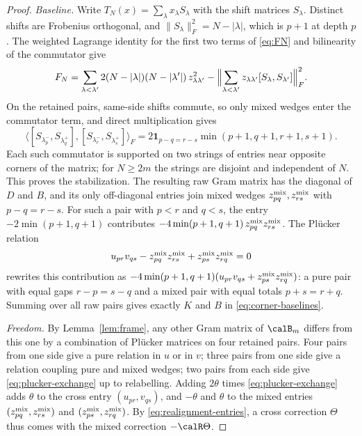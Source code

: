 \begin{proof} \emph{Baseline.} Write $T_N(x)=\sum_\lambda x_\lambda S_\lambda$
with the shift matrices $S_\lambda$. Distinct shifts are Frobenius
orthogonal, and \(\|S_\lambda\|_F^2=N-|\lambda|\), which is \(p+1\) at
depth \(p\). The weighted Lagrange identity for the first two terms of
\eqref{eq:FN} and bilinearity of the commutator give
\[
 F_N=\sum_{\lambda<\lambda'}2(N-|\lambda|)(N-|\lambda'|)\,z_{\lambda\lambda'}^2
 -\Bigl\|\sum_{\lambda<\lambda'}z_{\lambda\lambda'}[S_\lambda,S_{\lambda'}]\Bigr\|_F^2 .
\]
On the retained pairs, same-side shifts commute, so only mixed wedges
enter the commutator term, and direct multiplication gives
\begin{equation}
 \langle[S_{\lambda_p^-},S_{\lambda_q^+}],[S_{\lambda_r^-},S_{\lambda_s^+}]\rangle_F
   =2\mathbf1_{p-q=r-s}\min(p+1,q+1,r+1,s+1).           \label{eq:corner-commutators}
\end{equation}
Each such commutator is supported on two strings of entries near
opposite corners of the matrix; for \(N\ge2m\) the strings are disjoint
and independent of \(N\). This proves the stabilization. The resulting
raw Gram matrix has the diagonal of $D$ and $B$, and its only
off-diagonal entries join mixed wedges $z^{\rm mix}_{pq},z^{\rm mix}_{rs}$ with $p-q=r-s$.
For such a pair with $p<r$ and $q<s$, the entry
$-2\min(p+1,q+1)$ contributes $-4\min(p+1,q+1)\,z^{\rm mix}_{pq}z^{\rm mix}_{rs}$. The
Pl\"ucker relation
\begin{equation}\label{eq:plucker-exchange}
 u_{pr}v_{qs}-z^{\rm mix}_{pq}z^{\rm mix}_{rs}+z^{\rm mix}_{ps}z^{\rm mix}_{rq}=0
\end{equation}
rewrites this contribution as
$-4\min(p+1,q+1)(u_{pr}v_{qs}+z^{\rm mix}_{ps}z^{\rm mix}_{rq})$: a pure pair with equal gaps
$r-p=s-q$ and a mixed pair with equal totals $p+s=r+q$. Summing over
all raw pairs gives exactly $K$ and $B$ in \eqref{eq:corner-baselines}.

\emph{Freedom.} By Lemma~\ref{lem:frame}, any other Gram matrix of
$\calB_m$ differs from this one by a combination of Pl\"ucker matrices on
four retained pairs. Four pairs from one side give a pure relation in
$u$ or in $v$; three pairs from one side give a relation coupling pure
and mixed wedges; two pairs from each side give
\eqref{eq:plucker-exchange} up to relabelling. Adding $2\theta$ times
\eqref{eq:plucker-exchange} adds $\theta$ to the cross entry
$(u_{pr},v_{qs})$, and $-\theta$ and $\theta$ to the mixed entries
$(z^{\rm mix}_{pq},z^{\rm mix}_{rs})$ and $(z^{\rm mix}_{ps},z^{\rm mix}_{rq})$. By
\eqref{eq:realignment-entries}, a cross correction $\Theta$ thus comes
with the mixed correction $-\calR\Theta$.


\end{proof}
